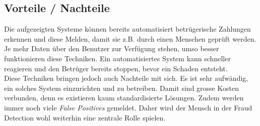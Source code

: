 \subsection{Vorteile / Nachteile}
Die aufgezeigten Systeme können bereits automatisiert betrügerische Zahlungen erkennen und diese Melden, damit sie z.B. durch einen Menschen geprüft werden. Je mehr Daten über den Benutzer zur Verfügung stehen, umso besser funktionieren diese Techniken. Ein automatisiertes System kann schneller reagieren und den Betrüger bereits stoppen, bevor ein Schaden entsteht.\\

Diese Techniken bringen jedoch auch Nachteile mit sich. Es ist sehr aufwändig, ein solches System einzurichten und zu betreiben. Damit sind grosse Kosten verbunden, denn es existieren kaum standardisierte Lösungen. Zudem werden immer noch viele \textit{False Positives} gemeldet. Daher wird der Mensch in der Fraud Detection wohl weiterhin eine zentrale Rolle spielen.